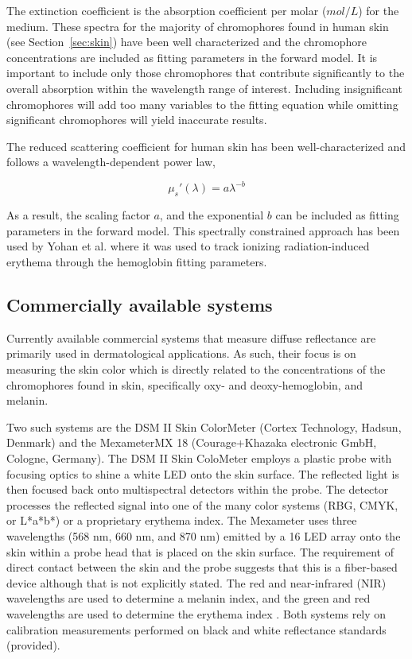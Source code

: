 The extinction coefficient is the absorption coefficient per molar ($mol/L$) for the medium. These spectra for the majority of chromophores found in human skin (see Section~\ref{sec:skin}) have been well characterized and the chromophore concentrations are included as fitting parameters in the forward model. It is important to include only those chromophores that contribute significantly to the overall absorption within the wavelength range of interest.\cite{Kim2011} Including insignificant chromophores will add too many variables to the fitting equation while omitting significant chromophores will yield inaccurate results.

The reduced scattering coefficient for human skin has been well-characterized and follows a wavelength-dependent power law,\cite{Doornbos1999}

\begin{equation}
\mu_s'(\lambda) = a\lambda^{-b}
\end{equation}

As a result, the scaling factor $a$, and the exponential $b$ can be included as fitting parameters in the forward model. This spectrally constrained approach has been used by Yohan et al.\cite{Yohan2014} where it was used to track ionizing radiation-induced erythema through the hemoglobin fitting parameters.

\subsection{Commercially available systems}
Currently available commercial systems that measure diffuse reflectance are primarily used in dermatological applications. As such, their focus is on measuring the skin color which is directly related to the concentrations of the chromophores found in skin, specifically oxy- and deoxy-hemoglobin, and melanin.

Two such systems are the DSM II Skin ColorMeter (Cortex Technology, Hadsun, Denmark) and the Mexameter\textregistered MX 18 (Courage+Khazaka electronic GmbH, Cologne, Germany). The DSM II Skin ColoMeter employs a plastic probe with focusing optics to shine a white LED onto the skin surface. The reflected light is then focused back onto multispectral detectors within the probe. The detector processes the reflected signal into one of the many color systems (RBG, CMYK, or L*a*b*) or a proprietary erythema index. The Mexameter uses three wavelengths (568 nm, 660 nm, and 870 nm) emitted by a 16 LED array onto the skin within a probe head that is placed on the skin surface. The requirement of direct contact between the skin and the probe suggests that this is a fiber-based device although that is not explicitly stated. The red and near-infrared (NIR) wavelengths are used to determine a melanin index, and the green and red wavelengths are used to determine the erythema index .\cite{Clarys2000} Both systems rely on calibration measurements performed on black and white reflectance standards (provided).

